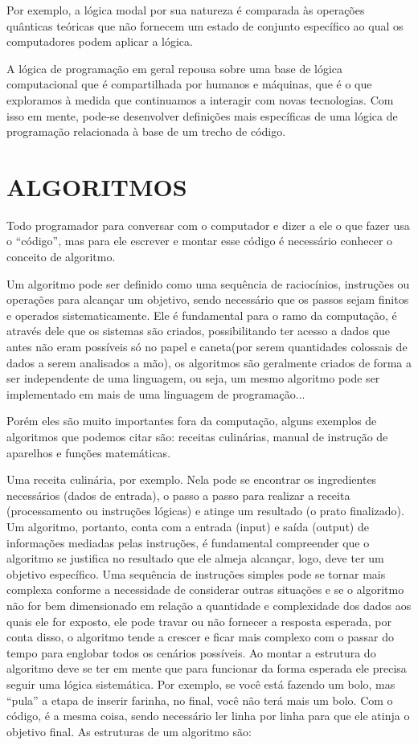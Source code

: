 Por exemplo, a lógica modal por sua natureza é comparada às operações quânticas teóricas que não fornecem um estado de conjunto específico ao qual os computadores podem aplicar a lógica. 

A lógica de programação em geral repousa sobre uma base de lógica computacional que é compartilhada por humanos e máquinas, que é o que exploramos à medida que continuamos a interagir com novas tecnologias. Com isso em mente, pode-se desenvolver definições mais específicas de uma lógica de programação relacionada à base de um trecho de código. 

\section{ALGORITMOS}
\label{sec:ALGORITMOS}

Todo programador para conversar com o computador e dizer a ele o que fazer usa o “código”, mas para ele escrever e montar esse código é necessário conhecer o conceito de algoritmo.  

Um algoritmo pode ser definido como uma sequência de raciocínios, instruções ou operações para alcançar um objetivo, sendo necessário que os passos sejam finitos e operados sistematicamente. 
Ele é fundamental para o ramo da computação, é através dele que os sistemas são criados, possibilitando ter acesso a dados que antes não eram possíveis só no papel e caneta(por serem quantidades colossais de dados a serem analisados a mão), os algoritmos são geralmente criados de forma a ser independente de uma linguagem, ou seja, um mesmo algoritmo pode ser implementado em mais de uma linguagem de programação... 

Porém eles são muito importantes fora da computação, alguns exemplos de algoritmos que podemos citar são: receitas culinárias, manual de instrução de aparelhos e funções matemáticas. 

Uma receita culinária, por exemplo. Nela pode se encontrar os ingredientes necessários (dados de entrada), o passo a passo para realizar a receita (processamento ou instruções lógicas) e atinge um resultado (o prato finalizado). 
Um algoritmo, portanto, conta com a entrada (input) e saída (output) de informações mediadas pelas instruções, é fundamental compreender que o algoritmo se justifica no resultado que ele almeja alcançar, logo, deve ter um objetivo específico. Uma sequência de instruções simples pode se tornar mais complexa conforme a necessidade de considerar outras situações e se o algoritmo não for bem dimensionado em relação a quantidade e complexidade dos dados aos quais ele for exposto, ele pode travar ou não fornecer a resposta esperada, por conta disso, o algoritmo tende a crescer e ficar mais complexo com o passar do tempo para englobar todos os cenários possíveis. 
Ao montar a estrutura do algoritmo deve se ter em mente que para funcionar da forma esperada ele precisa seguir uma lógica sistemática. Por exemplo, se você está fazendo um bolo, mas “pula” a etapa de inserir farinha, no final, você não terá mais um bolo. 
Com o código, é a mesma coisa, sendo necessário ler linha por linha para que ele atinja o objetivo final. As estruturas de um algoritmo são: 

